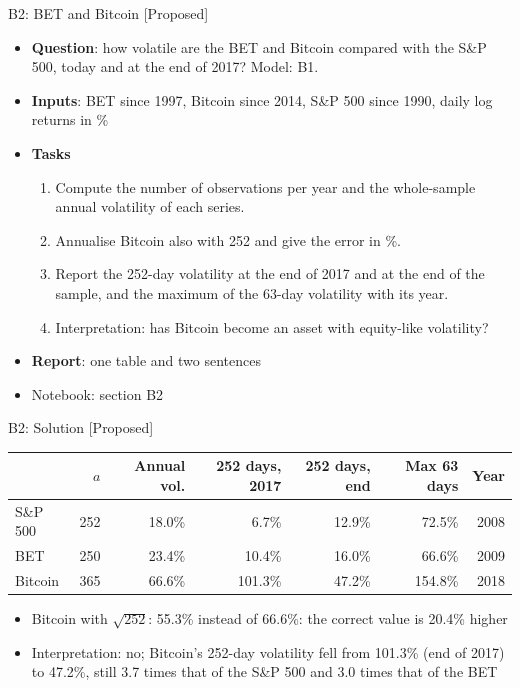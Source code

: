 \begin{frame}{B2: BET and Bitcoin [Proposed]}
\itemsize{\footnotesize}
\begin{itemize}
\item \textbf{Question}: how volatile are the BET and Bitcoin compared with the S\&P 500, today and at the end of 2017? Model: B1.
\item \textbf{Inputs}: BET since 1997, Bitcoin since 2014, S\&P 500 since 1990, daily log returns in \%
\item \textbf{Tasks}
\begin{enumerate}
    \item Compute the number of observations per year and the whole-sample annual volatility of each series.
    \item Annualise Bitcoin also with 252 and give the error in \%.
    \item Report the 252-day volatility at the end of 2017 and at the end of the sample, and the maximum of the 63-day volatility with its year.
    \item Interpretation: has Bitcoin become an asset with equity-like volatility?
\end{enumerate}
\item \textbf{Report}: one table and two sentences
\item Notebook: section B2
\end{itemize}
\end{frame}

\ifsolutions
\begin{frame}{B2: Solution [Proposed]}
\itemsize{\footnotesize}
\begin{center}
\footnotesize
\begin{tabular}{lrrrrrr}
\toprule
& $a$ & \textbf{Annual vol.} & \textbf{252 days, 2017} & \textbf{252 days, end} & \textbf{Max 63 days} & \textbf{Year} \\
\midrule
S\&P 500 & 252 & 18.0\% & 6.7\% & 12.9\% & 72.5\% & 2008 \\
BET & 250 & 23.4\% & 10.4\% & 16.0\% & 66.6\% & 2009 \\
Bitcoin & 365 & 66.6\% & 101.3\% & 47.2\% & 154.8\% & 2018 \\
\bottomrule
\end{tabular}
\end{center}
\begin{itemize}
    \item Bitcoin with $\sqrt{252}$: 55.3\% instead of 66.6\%: the correct value is 20.4\% higher
    \item Interpretation: no; Bitcoin's 252-day volatility fell from 101.3\% (end of 2017) to 47.2\%, still 3.7 times that of the S\&P 500 and 3.0 times that of the BET
\end{itemize}
\end{frame}
\fi

